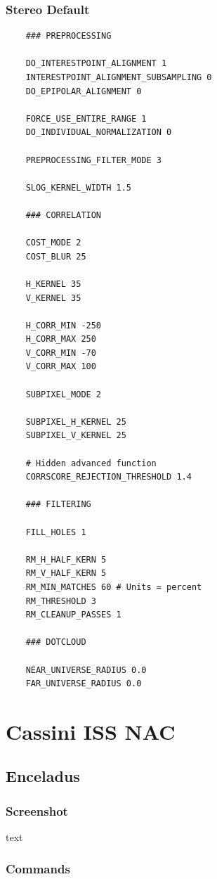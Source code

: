 \subsubsection*{Stereo Default}

\begin{verbatim}
    ### PREPROCESSING

    DO_INTERESTPOINT_ALIGNMENT 1
    INTERESTPOINT_ALIGNMENT_SUBSAMPLING 0
    DO_EPIPOLAR_ALIGNMENT 0

    FORCE_USE_ENTIRE_RANGE 1
    DO_INDIVIDUAL_NORMALIZATION 0

    PREPROCESSING_FILTER_MODE 3

    SLOG_KERNEL_WIDTH 1.5

    ### CORRELATION

    COST_MODE 2
    COST_BLUR 25

    H_KERNEL 35
    V_KERNEL 35

    H_CORR_MIN -250
    H_CORR_MAX 250
    V_CORR_MIN -70
    V_CORR_MAX 100

    SUBPIXEL_MODE 2

    SUBPIXEL_H_KERNEL 25
    SUBPIXEL_V_KERNEL 25

    # Hidden advanced function
    CORRSCORE_REJECTION_THRESHOLD 1.4

    ### FILTERING

    FILL_HOLES 1

    RM_H_HALF_KERN 5
    RM_V_HALF_KERN 5
    RM_MIN_MATCHES 60 # Units = percent
    RM_THRESHOLD 3
    RM_CLEANUP_PASSES 1

    ### DOTCLOUD

    NEAR_UNIVERSE_RADIUS 0.0
    FAR_UNIVERSE_RADIUS 0.0
\end{verbatim}

\section{Cassini ISS NAC}

\subsection{Enceladus}

\subsubsection*{Screenshot}

text

\subsubsection*{Commands}

